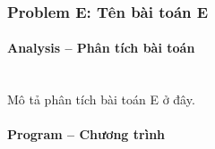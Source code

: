 \subsubsection{Problem E: Tên bài toán E}

\paragraph{Analysis -- Phân tích bài toán} \mbox{} \\

Mô tả phân tích bài toán E ở đây.

\paragraph{Program -- Chương trình} \mbox{} \\

\begin{lstlisting} 

\end{lstlisting}